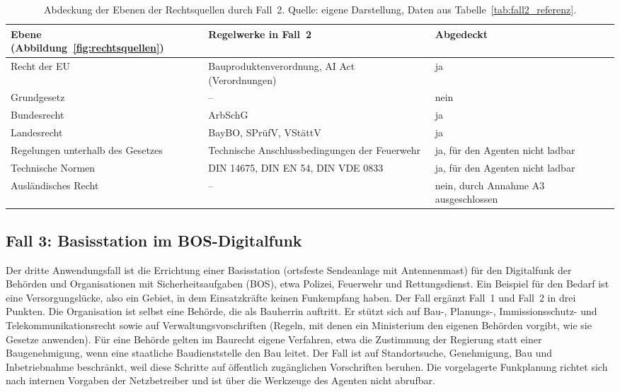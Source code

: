 \begin{table}[H]
  \centering
  \small
  \renewcommand{\arraystretch}{1.3}
  \begin{tabularx}{\textwidth}{>{\raggedright\arraybackslash}p{4.2cm} Y >{\raggedright\arraybackslash}p{3.0cm}}
    \toprule
    \textbf{Ebene (Abbildung~\ref{fig:rechtsquellen})} & \textbf{Regelwerke in Fall~2} & \textbf{Abgedeckt} \\
    \midrule
    Recht der EU & Bauproduktenverordnung, AI Act (Verordnungen) & ja \\
    Grundgesetz & -- & nein \\
    Bundesrecht & ArbSchG & ja \\
    Landesrecht & BayBO, SPrüfV, VStättV & ja \\
    Regelungen unterhalb des Gesetzes & Technische Anschlussbedingungen der Feuerwehr & ja, für den Agenten nicht ladbar \\
    Technische Normen & DIN 14675, DIN EN 54, DIN VDE 0833 & ja, für den Agenten nicht ladbar \\
    Ausländisches Recht & -- & nein, durch Annahme A3 ausgeschlossen \\
    \bottomrule
  \end{tabularx}
  \caption[Abdeckung der Rechtsebenen durch Fall~2]{Abdeckung der Ebenen der Rechtsquellen durch Fall~2. Quelle: eigene Darstellung, Daten aus Tabelle~\ref{tab:fall2_referenz}.}
  \label{tab:fall2_abdeckung}
\end{table}

\subsection{Fall 3: Basisstation im BOS-Digitalfunk}\label{sec:fall3}
Der dritte Anwendungsfall ist die Errichtung einer Basisstation (ortsfeste Sendeanlage mit Antennenmast) für den Digitalfunk der Behörden und Organisationen mit Sicherheitsaufgaben (BOS), etwa Polizei, Feuerwehr und Rettungsdienst.
Ein Beispiel für den Bedarf ist eine Versorgungslücke, also ein Gebiet, in dem Einsatzkräfte keinen Funkempfang haben.
Der Fall ergänzt Fall~1 und Fall~2 in drei Punkten.
Die Organisation ist selbst eine Behörde, die als Bauherrin auftritt.
Er stützt sich auf Bau-, Planungs-, Immissionsschutz- und Telekommunikationsrecht sowie auf Verwaltungsvorschriften (Regeln, mit denen ein Ministerium den eigenen Behörden vorgibt, wie sie Gesetze anwenden).
Für eine Behörde gelten im Baurecht eigene Verfahren, etwa die Zustimmung der Regierung statt einer Baugenehmigung, wenn eine staatliche Baudienststelle den Bau leitet.
Der Fall ist auf Standortsuche, Genehmigung, Bau und Inbetriebnahme beschränkt, weil diese Schritte auf öffentlich zugänglichen Vorschriften beruhen.
Die vorgelagerte Funkplanung richtet sich nach internen Vorgaben der Netzbetreiber und ist über die Werkzeuge des Agenten nicht abrufbar.

